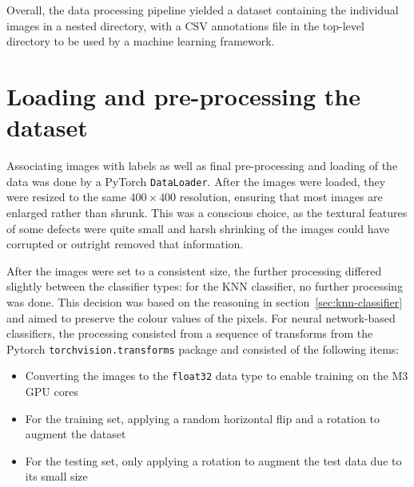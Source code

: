 Overall, the data processing pipeline yielded a dataset containing the individual images in a nested directory, with
a CSV annotations file in the top-level directory to be used by a machine learning framework.

\section{Loading and pre-processing the dataset}
\label{sec:loading-and-pre-processing-the-dataset}
Associating images with labels as well as final pre-processing and loading of the data was done by a PyTorch \verb|DataLoader|.
After the images were loaded, they were resized to the same $400 \times 400$ resolution, ensuring that most images are
enlarged rather than shrunk.
This was a conscious choice, as the textural features of some defects were quite small and harsh shrinking of the images
could have corrupted or outright removed that information.

After the images were set to a consistent size, the further processing differed slightly between the classifier types:
for the KNN classifier, no further processing was done.
This decision was based on the reasoning in section~\ref{sec:knn-classifier} and aimed to preserve the colour values of the pixels.
For neural network-based classifiers, the processing consisted from a sequence of transforms from the Pytorch \verb|torchvision.transforms|
package and consisted of the following items:
\begin{itemize}
    \item Converting the images to the \verb|float32| data type to enable training on the M3 GPU cores
    \item For the training set, applying a random horizontal flip and a rotation to augment the dataset
    \item For the testing set, only applying a rotation to augment the test data due to its small size
\end{itemize}

